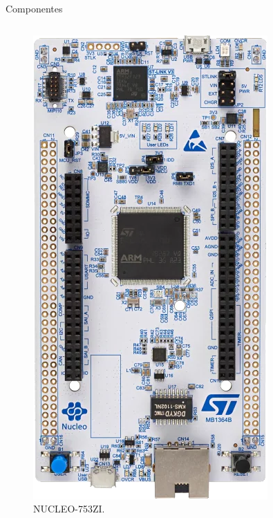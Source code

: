\documentclass{if-beamer}
\begin{document}
\begin{frame}{Componentes}
\begin{columns}
\begin{column}{0.4\textwidth}
			\begin{figure}[H]
				\centering
				\includegraphics[width=0.7\linewidth]{img/nucleo}
				\caption{NUCLEO-753ZI.}
				\label{fig:nucleo}
			\end{figure}
			
		\end{column}
		
	\end{columns}
	

\end{frame}
\end{document}
